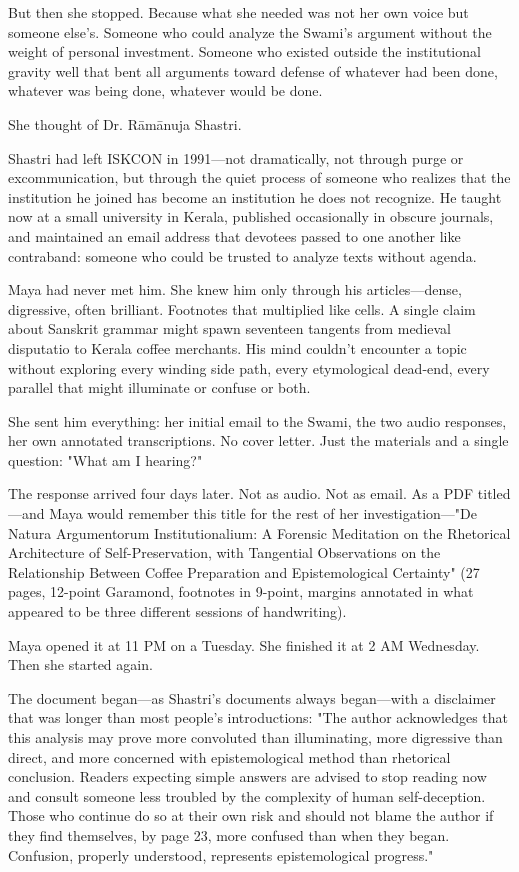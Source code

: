 \documentclass[12pt,twoside]{book}
\begin{document}
But then she stopped. Because what she needed was not her own voice but someone else's. Someone who could analyze the Swami's argument without the weight of personal investment. Someone who existed outside the institutional gravity well that bent all arguments toward defense of whatever had been done, whatever was being done, whatever would be done.

She thought of Dr. Rāmānuja Shastri.

Shastri had left ISKCON in 1991—not dramatically, not through purge or excommunication, but through the quiet process of someone who realizes that the institution he joined has become an institution he does not recognize. He taught now at a small university in Kerala, published occasionally in obscure journals, and maintained an email address that devotees passed to one another like contraband: someone who could be trusted to analyze texts without agenda.

Maya had never met him. She knew him only through his articles—dense, digressive, often brilliant. Footnotes that multiplied like cells. A single claim about Sanskrit grammar might spawn seventeen tangents from medieval disputatio to Kerala coffee merchants. His mind couldn't encounter a topic without exploring every winding side path, every etymological dead-end, every parallel that might illuminate or confuse or both.

She sent him everything: her initial email to the Swami, the two audio responses, her own annotated transcriptions. No cover letter. Just the materials and a single question: "What am I hearing?"

The response arrived four days later. Not as audio. Not as email. As a PDF titled—and Maya would remember this title for the rest of her investigation—"De Natura Argumentorum Institutionalium: A Forensic Meditation on the Rhetorical Architecture of Self-Preservation, with Tangential Observations on the Relationship Between Coffee Preparation and Epistemological Certainty" (27 pages, 12-point Garamond, footnotes in 9-point, margins annotated in what appeared to be three different sessions of handwriting).

Maya opened it at 11 PM on a Tuesday. She finished it at 2 AM Wednesday. Then she started again.

The document began—as Shastri's documents always began—with a disclaimer that was longer than most people's introductions: "The author acknowledges that this analysis may prove more convoluted than illuminating, more digressive than direct, and more concerned with epistemological method than rhetorical conclusion. Readers expecting simple answers are advised to stop reading now and consult someone less troubled by the complexity of human self-deception. Those who continue do so at their own risk and should not blame the author if they find themselves, by page 23, more confused than when they began. Confusion, properly understood, represents epistemological progress."
\end{document}
